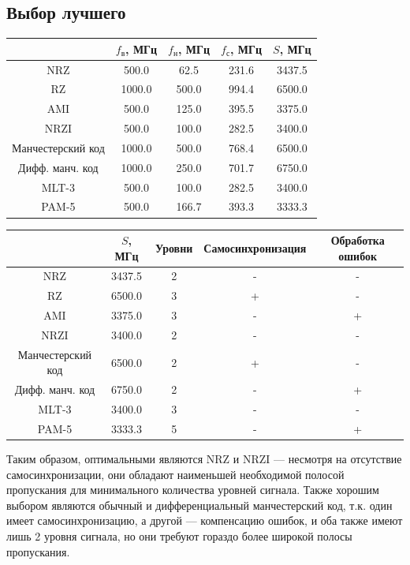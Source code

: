 \subsection{Выбор лучшего}
\begin{center}
    \begin{tabular}{c|cccc}
        & $f_\mathrm{\text{в}}$, МГц
        & $f_\mathrm{\text{н}}$, МГц
        & $f_\mathrm{\text{с}}$, МГц
        & $S$, МГц \\ \hline
        NRZ               &  500.0 &  62.5 & 231.6 & 3437.5 \\
        RZ                & 1000.0 & 500.0 & 994.4 & 6500.0 \\
        AMI               &  500.0 & 125.0 & 395.5 & 3375.0 \\
        NRZI              &  500.0 & 100.0 & 282.5 & 3400.0 \\
        Манчестерский код & 1000.0 & 500.0 & 768.4 & 6500.0 \\
        Дифф. манч. код   & 1000.0 & 250.0 & 701.7 & 6750.0 \\
        MLT-3             &  500.0 & 100.0 & 282.5 & 3400.0 \\
        PAM-5             &  500.0 & 166.7 & 393.3 & 3333.3 \\
    \end{tabular}
\end{center}

\begin{center}
    \begin{tabular}{c|cccc}
        & $S$, МГц
        & Уровни
        & Самосинхронизация
        & Обработка ошибок \\ \hline
        NRZ               & 3437.5 & 2 & - & - \\
        RZ                & 6500.0 & 3 & + & - \\
        AMI               & 3375.0 & 3 & - & + \\
        NRZI              & 3400.0 & 2 & - & - \\
        Манчестерский код & 6500.0 & 2 & + & - \\
        Дифф. манч. код   & 6750.0 & 2 & - & + \\
        MLT-3             & 3400.0 & 3 & - & - \\
        PAM-5             & 3333.3 & 5 & - & + \\
    \end{tabular}
\end{center}

Таким образом, оптимальными являются NRZ и NRZI --- несмотря на отсутствие самосинхронизации,
они обладают наименьшей необходимой полосой пропускания для минимального количества уровней сигнала.
Также хорошим выбором являются обычный и дифференциальный манчестерский код, т.к.
один имеет самосинхронизацию, а другой --- компенсацию ошибок, и оба также имеют лишь 2 уровня сигнала,
но они требуют гораздо более широкой полосы пропускания.
